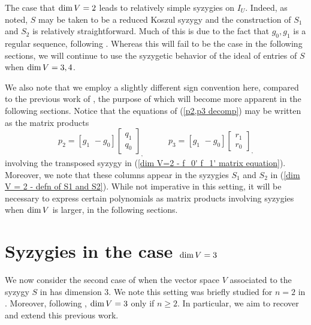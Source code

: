 \documentclass[reqno]{amsart}
\numberwithin{equation}{section}
\theoremstyle{definition}
\def\q{\mathfrak{q}}
\def\dim{\mathop{\rm dim}}
\begin{document}
The case that $\dim V=2$ leads to relatively simple syzygies on $I_U$. Indeed, as noted, $S$ may be taken to be a reduced Koszul syzygy and the construction of $S_1$ and $S_2$ is relatively straightforward. Much of this is due to the fact that $g_0, g_1$ is a regular sequence, following . Whereas this will fail to be the case in the following sections, we will continue to use the syzygetic behavior of the ideal of entries of $S$ when $\dim V=3,4$.




We also note that we employ a slightly different sign convention here, compared to the previous work of \cite{DS16,Weaver25}, the purpose of which will become more apparent in the following sections. Notice that the equations of (\ref{p2,p3 decomp}) may be written as the matrix products
\[
p_2= [g_1\,\, -g_0] \begin{bmatrix}
    q_1\\q_0
\end{bmatrix}_, \quad\quad\quad 
p_3= [g_1\,\, -g_0] \begin{bmatrix}
    r_1\\r_0
\end{bmatrix}_,
\]
involving the transposed syzygy in (\ref{dim V=2 - f_0' f_1' matrix equation}). Moreover, we note that these columns appear in the syzygies $S_1$ and $S_2$ in (\ref{dim V = 2 - defn of S1 and S2}). While not imperative in this setting, it will be necessary to express certain polynomials as matrix products involving syzygies when $\dim V$ is larger, in the following sections.








\section{Syzygies in the case $\dim V=3$}\label{dim 3 section}

We now consider the second case of  when the vector space $V$ associated to the syzygy $S$ in  has dimension $3$. We note this setting was briefly studied for $n=2$ in \cite{Weaver25}. Moreover, following , $\dim V =3$ only if $n\geq 2$. In particular, we aim to recover and extend this previous work.
\end{document}
